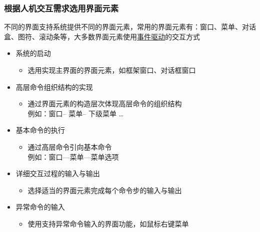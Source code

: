 \documentclass[compress]{beamer}
\begin{document}
\begin{frame}
\frametitle{根据人机交互需求选用界面元素}

不同的界面支持系统提供不同的界面元素，常用的界面元素有：{窗口}、{菜单}、{对话盒}、{图符}、{滚动条}等，大多数界面元素使用\uline{事件驱动}的交互方式 \\

\begin{overlayarea}{\columnwidth}{.7\textheight}

 {
  \begin{itemize}
    \item 系统的启动
      \begin{itemize}
          \item 选用实现主界面的界面元素，如框架窗口、对话框窗口
      \end{itemize}
    \item 高层命令组织结构的实现
      \begin{itemize}
        \item 通过界面元素的构造层次体现高层命令的组织结构 \\
          \quad 例如：窗口-- 菜单-- 下级菜单 \ldots
      \end{itemize}
  \end{itemize}
}

 {
  \begin{itemize}
    \item 基本命令的执行
      \begin{itemize}
        \item 通过高层命令引向基本命令 \\
          \quad 例如：窗口—菜单—菜单选项
      \end{itemize}
    \item 详细交互过程的输入与输出
      \begin{itemize}
        \item 选择适当的界面元素完成每个命令步的输入与输出
      \end{itemize}
    \item 异常命令的输入
      \begin{itemize}
          \item 使用支持异常命令输入的界面功能，如鼠标右键菜单
      \end{itemize}
  \end{itemize}
}
\end{overlayarea}

\end{frame}
\end{document}
